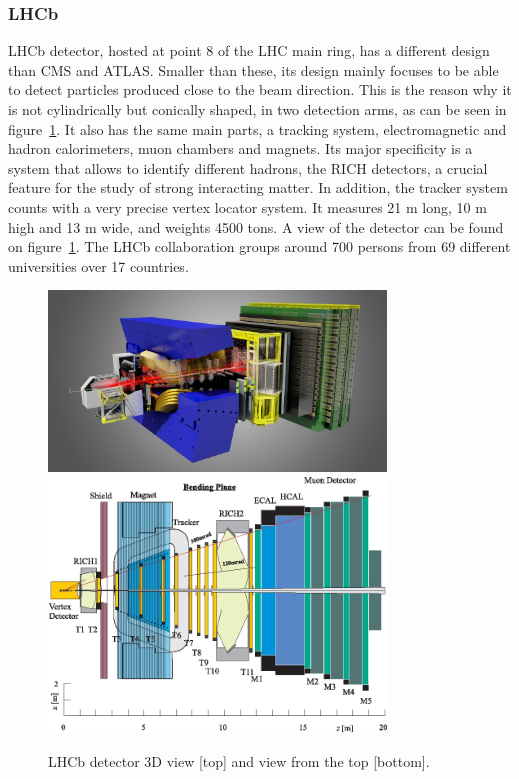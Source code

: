 \subsubsection{LHCb}
\label{sec:lhcb}

LHCb detector, hosted at point 8 of the LHC main ring, has a different design than CMS and ATLAS. Smaller than these, its design mainly focuses to be able to detect particles produced close to the beam direction. This is the reason why it is not cylindrically but conically shaped, in two detection arms, as can be seen in figure~\ref{fig:lhcbdet}. It also has the same main parts, a tracking system, electromagnetic and hadron calorimeters, muon chambers and magnets. Its major specificity is a system that allows to identify different hadrons, the RICH detectors, a crucial feature for the study of strong interacting matter. In addition, the tracker system counts with a very precise vertex locator system. It measures 21 m long, 10 m high and 13 m wide, and weights 4500 tons. A view of the detector can be found on figure~\ref{fig:lhcbdet}. The LHCb collaboration groups around 700 persons from 69 different universities over 17 countries. 

\begin{figure}[!Hhtbp]
  \begin{center}
    \includegraphics[width=0.8\textwidth]{figs/LHCbDetectorlight1.jpg}
    \includegraphics[width=0.8\textwidth]{figs/LHCb_UpView.jpg}
    \caption{LHCb detector 3D view [top] and view from the top [bottom]. }
    \label{fig:lhcbdet}
  \end{center}
\end{figure}

